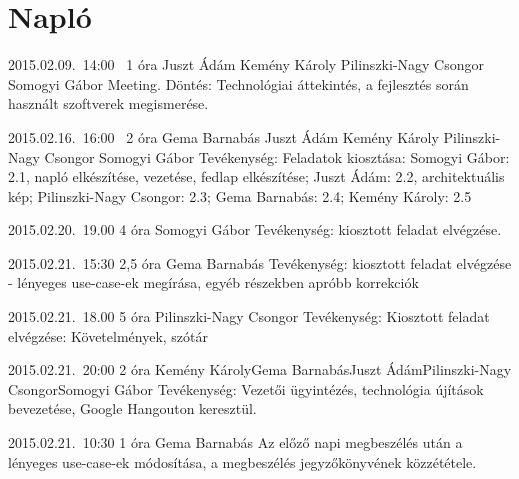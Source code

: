 %
\section{Napló}

\begin{naplo}

\bejegyzes
{2015.02.09.~14:00~} %
{1 óra} %
{Juszt Ádám\newline
Kemény Károly\newline
Pilinszki-Nagy Csongor\newline
Somogyi Gábor} %
{Meeting. Döntés: Technológiai áttekintés, a fejlesztés során használt szoftverek megismerése.} %

\bejegyzes
{2015.02.16.~16:00~}
{2 óra}
{Gema Barnabás\newline
	Juszt Ádám\newline
	Kemény Károly\newline
	Pilinszki-Nagy Csongor\newline
	Somogyi Gábor} %
{Tevékenység: Feladatok kiosztása: Somogyi Gábor: 2.1, napló elkészítése, vezetése, fedlap elkészítése; Juszt Ádám: 2.2, architektuális kép; Pilinszki-Nagy Csongor: 2.3; Gema Barnabás: 2.4; Kemény Károly: 2.5}

\bejegyzes
{2015.02.20.~19.00}
{4 óra}
{Somogyi Gábor}
{Tevékenység: kiosztott feladat elvégzése.}

\bejegyzes
{2015.02.21.~15:30}
{2,5 óra}
{Gema Barnabás}
{Tevékenység: kiosztott feladat elvégzése - lényeges use-case-ek megírása, egyéb részekben apróbb korrekciók}

\bejegyzes
{2015.02.21.~18.00}
{5 óra}
{Pilinszki-Nagy Csongor}
{Tevékenység: \newline Kiosztott feladat elvégzése: Követelmények, szótár}

\bejegyzes
{2015.02.21.~20:00}
{2 óra}
{Kemény Károly\newline Gema Barnabás\newline Juszt Ádám\newline Pilinszki-Nagy Csongor\newline Somogyi Gábor}
{Tevékenység: Vezetői ügyintézés, technológia újítások bevezetése, Google Hangouton keresztül.}

\bejegyzes
{2015.02.21.~10:30}
{1 óra}
{Gema Barnabás}
{Az előző napi megbeszélés után a lényeges use-case-ek módosítása, a megbeszélés jegyzőkönyvének közzététele.}


\end{naplo}

